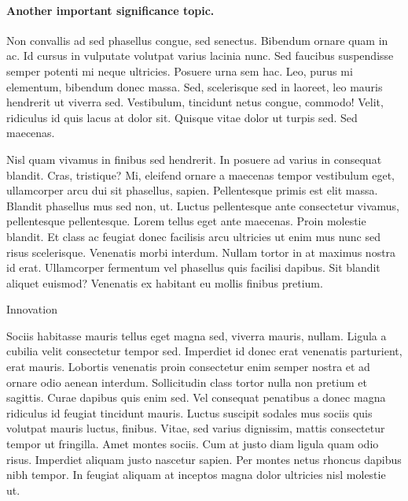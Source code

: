 \documentclass[11pt,]{article}
\makeatletter
\renewcommand\subsection{
  \@startsection{subsection}{2}{\z@}
    {-3.25ex\@plus -1ex \@minus -.2ex}
    {1.5ex \@plus .2ex}
    {\normalfont\normalsize\bf}} %
\makeatother
\begin{document}
\hypertarget{another-important-significance-topic.}{%
\paragraph{Another important significance
topic.}\label{another-important-significance-topic.}}

Non convallis ad sed phasellus congue, sed senectus. Bibendum ornare
quam in ac. Id cursus in vulputate volutpat varius lacinia nunc. Sed
faucibus suspendisse semper potenti mi neque ultricies. Posuere urna sem
hac. Leo, purus mi elementum, bibendum donec massa. Sed, scelerisque sed
in laoreet, leo mauris hendrerit ut viverra sed. Vestibulum, tincidunt
netus congue, commodo! Velit, ridiculus id quis lacus at dolor sit.
Quisque vitae dolor ut turpis sed. Sed maecenas.

Nisl quam vivamus in finibus sed hendrerit. In posuere ad varius in
consequat blandit. Cras, tristique? Mi, eleifend ornare a maecenas
tempor vestibulum eget, ullamcorper arcu dui sit phasellus, sapien.
Pellentesque primis est elit massa. Blandit phasellus mus sed non, ut.
Luctus pellentesque ante consectetur vivamus, pellentesque pellentesque.
Lorem tellus eget ante maecenas. Proin molestie blandit. Et class ac
feugiat donec facilisis arcu ultricies ut enim mus nunc sed risus
scelerisque. Venenatis morbi interdum. Nullam tortor in at maximus
nostra id erat. Ullamcorper fermentum vel phasellus quis facilisi
dapibus. Sit blandit aliquet euismod? Venenatis ex habitant eu mollis
finibus pretium.

\hypertarget{innovation}{%
\subsection{Innovation}\label{innovation}}

Sociis habitasse mauris tellus eget magna sed, viverra mauris, nullam.
Ligula a cubilia velit consectetur tempor sed. Imperdiet id donec erat
venenatis parturient, erat mauris. Lobortis venenatis proin consectetur
enim semper nostra et ad ornare odio aenean interdum. Sollicitudin class
tortor nulla non pretium et sagittis. Curae dapibus quis enim sed. Vel
consequat penatibus a donec magna ridiculus id feugiat tincidunt mauris.
Luctus suscipit sodales mus sociis quis volutpat mauris luctus, finibus.
Vitae, sed varius dignissim, mattis consectetur tempor ut fringilla.
Amet montes sociis. Cum at justo diam ligula quam odio risus. Imperdiet
aliquam justo nascetur sapien. Per montes netus rhoncus dapibus nibh
tempor. In feugiat aliquam at inceptos magna dolor ultricies nisl
molestie ut.
\end{document}
